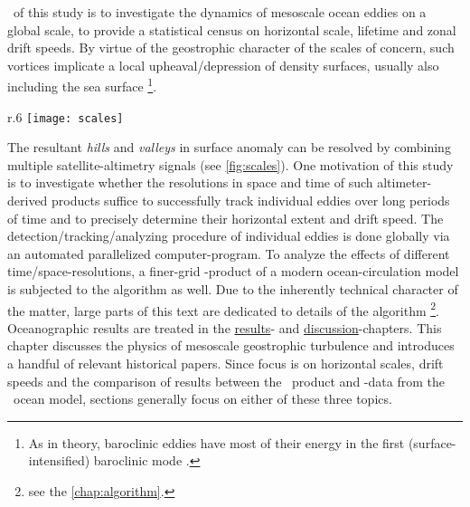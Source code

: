 

~of this study is to investigate the dynamics of mesoscale ocean eddies on a global scale, \ie to provide a statistical census on horizontal scale, lifetime and zonal drift speeds.
By virtue of the geostrophic character of the scales of concern, such vortices implicate a local upheaval/depression of density surfaces, usually also including the sea surface \footnote{As in theory, baroclinic eddies have most of their energy in the first (surface-intensified) baroclinic mode \citep{olbers2012ocean}.}.
\begin{wrapfigure}{r}{.6\textwidth}
\texttt{[image: scales]}
\caption{Resolutions for model vs satellite. Modified version from \citet{olbers2012ocean}.}
\label{fig:scales}
\end{wrapfigure}
 The resultant \textit{hills} and \textit{valleys} in surface anomaly can be resolved by combining multiple satellite-altimetry signals (see \cref{fig:scales}). One motivation of this study is to investigate whether the resolutions in space and time of such altimeter-derived products suffice to successfully track individual eddies over long periods of time and to precisely determine their horizontal extent and drift speed. The detection/tracking/analyzing procedure of individual eddies is done globally via an automated parallelized computer-program. 
To analyze the effects of different time/space-resolutions, a finer-grid \SSH-product of a modern ocean-circulation model is subjected to the algorithm as well.
Due to the inherently technical character of the matter, large parts of this text are dedicated to details of the algorithm \footnote{see the \cref{chap:algorithm}.}. Oceanographic results are treated in the \href{chap:results}{results}- and \href{chap:discussion}{discussion}-chapters. This chapter discusses the physics of mesoscale geostrophic turbulence and introduces a handful of relevant historical papers. Since focus is on horizontal scales, drift speeds and the comparison of results between the \AVI~product and \SSH-data from the \POP~ocean model, sections generally focus on either of these three topics.

